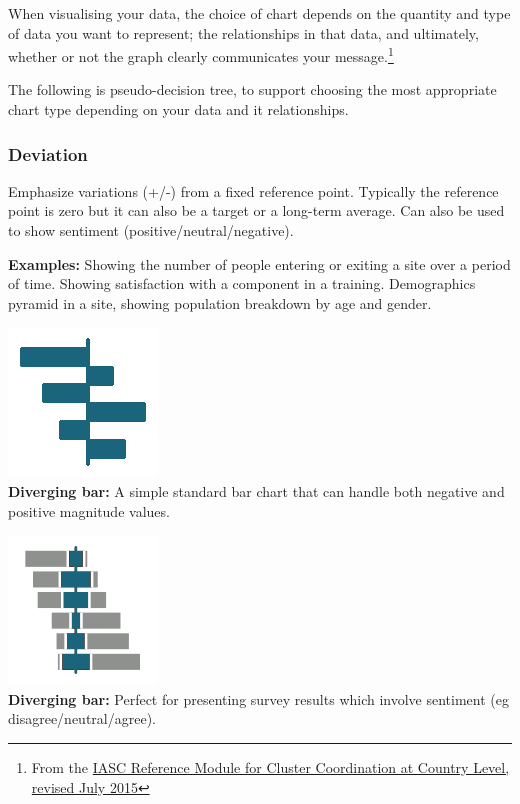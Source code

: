 \documentclass[
  a4paper,
  onecolumn,
  oneside]{book}
\begin{document}
When visualising your data, the choice of chart depends on the quantity
and type of data you want to represent; the relationships in that data,
and ultimately, whether or not the graph clearly communicates your
message.\footnote{From the
  \href{files/Reference\%20Module\%20for\%20Cluster\%20Coordination\%20at\%20Country\%20Level.pdf}{IASC
  Reference Module for Cluster Coordination at Country Level, revised
  July 2015}}

The following is pseudo-decision tree, to support choosing the most
appropriate chart type depending on your data and it relationships.

\hypertarget{deviation}{%
\subsubsection{Deviation}\label{deviation}}

Emphasize variations (+/-) from a fixed reference point. Typically the
reference point is zero but it can also be a target or a long-term
average. Can also be used to show sentiment (positive/neutral/negative).

\textbf{Examples:} Showing the number of people entering or exiting a
site over a period of time. Showing satisfaction with a component in a
training. Demographics pyramid in a site, showing population breakdown
by age and gender.

\includegraphics{part1/images/deviation1.png}\\
\textbf{Diverging bar:} A simple standard bar chart that can handle both
negative and positive magnitude values.

\includegraphics{part1/images/deviation2.png}\\
\textbf{Diverging bar:} Perfect for presenting survey results which
involve sentiment (eg disagree/neutral/agree).
\end{document}

